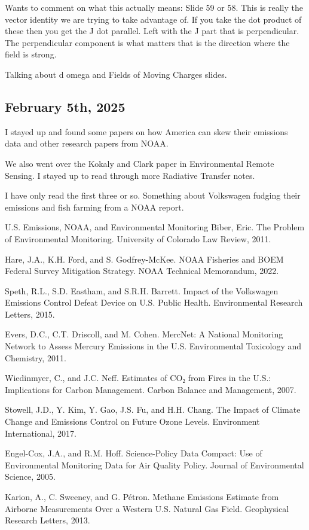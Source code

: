 \documentclass{article}
\begin{document}
Wants to comment on what this actually means: 
Slide 59 or 58. This is really the vector identity we are trying to take advantage of. If you take the dot product of these then you get the J dot parallel. Left with the J part that is perpendicular. The perpendicular component is what matters that is the direction where the field is strong. 

Talking about d omega and Fields of Moving Charges slides. 


\subsection{February 5th, 2025}
I stayed up and found some papers on how America can skew their emissions data and other research papers from NOAA. 

We also went over the Kokaly and Clark paper in Environmental Remote Sensing. I stayed up to read through more Radiative Transfer notes.

I have only read the first three or so. Something about Volkswagen fudging their emissions and fish farming from a NOAA report. 

 U.S. Emissions, NOAA, and Environmental Monitoring
Biber, Eric. The Problem of Environmental Monitoring. University of Colorado Law Review, 2011.

Hare, J.A., K.H. Ford, and S. Godfrey-McKee. NOAA Fisheries and BOEM Federal Survey Mitigation Strategy. NOAA Technical Memorandum, 2022.

Speth, R.L., S.D. Eastham, and S.R.H. Barrett. Impact of the Volkswagen Emissions Control Defeat Device on U.S. Public Health. Environmental Research Letters, 2015.

Evers, D.C., C.T. Driscoll, and M. Cohen. MercNet: A National Monitoring Network to Assess Mercury Emissions in the U.S. Environmental Toxicology and Chemistry, 2011.

Wiedinmyer, C., and J.C. Neff. Estimates of CO₂ from Fires in the U.S.: Implications for Carbon Management. Carbon Balance and Management, 2007.

Stowell, J.D., Y. Kim, Y. Gao, J.S. Fu, and H.H. Chang. The Impact of Climate Change and Emissions Control on Future Ozone Levels. Environment International, 2017.

Engel-Cox, J.A., and R.M. Hoff. Science-Policy Data Compact: Use of Environmental Monitoring Data for Air Quality Policy. Journal of Environmental Science, 2005.

Karion, A., C. Sweeney, and G. Pétron. Methane Emissions Estimate from Airborne Measurements Over a Western U.S. Natural Gas Field. Geophysical Research Letters, 2013.
\end{document}

